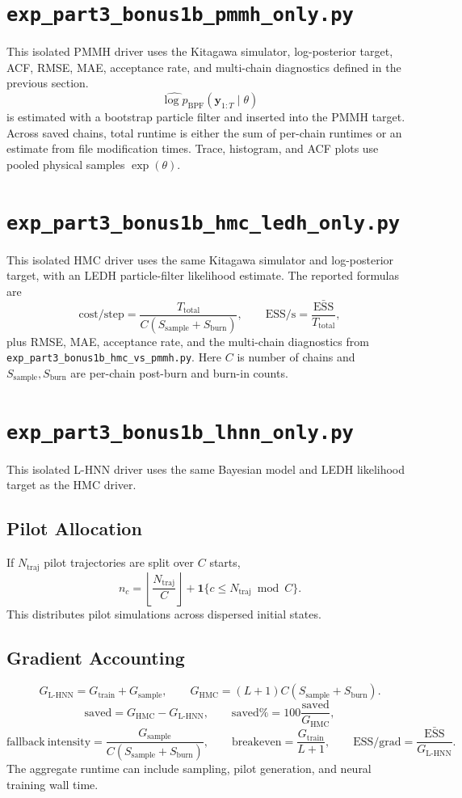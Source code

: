 \documentclass[11pt]{article}
\newcommand{\code}[1]{\texttt{#1}}
\newcommand{\ESS}{\mathrm{ESS}}
\newcommand{\ind}{\mathbf{1}}
\begin{document}
\section{\code{exp\_part3\_bonus1b\_pmmh\_only.py}}
This isolated PMMH driver uses the Kitagawa simulator, log-posterior target, ACF, RMSE, MAE, acceptance rate, and multi-chain diagnostics defined in the previous section.
\[
\widehat{\log p}_{\mathrm{BPF}}(\bm y_{1:T}\mid\theta)
\]
is estimated with a bootstrap particle filter and inserted into the PMMH target. Across saved chains, total runtime is either the sum of per-chain runtimes or an estimate from file modification times. Trace, histogram, and ACF plots use pooled physical samples \(\exp(\theta)\).

\section{\code{exp\_part3\_bonus1b\_hmc\_ledh\_only.py}}
This isolated HMC driver uses the same Kitagawa simulator and log-posterior target, with an LEDH particle-filter likelihood estimate. The reported formulas are
\[
\mathrm{cost/step}=\frac{T_{\mathrm{total}}}{C(S_{\mathrm{sample}}+S_{\mathrm{burn}})},\qquad
\mathrm{ESS/s}=\frac{\bar{\ESS}}{T_{\mathrm{total}}},
\]
plus RMSE, MAE, acceptance rate, and the multi-chain diagnostics from \code{exp\_part3\_bonus1b\_hmc\_vs\_pmmh.py}. Here \(C\) is number of chains and \(S_{\mathrm{sample}},S_{\mathrm{burn}}\) are per-chain post-burn and burn-in counts.

\section{\code{exp\_part3\_bonus1b\_lhnn\_only.py}}
This isolated L-HNN driver uses the same Bayesian model and LEDH likelihood target as the HMC driver.

\subsection*{Pilot Allocation}
If \(N_{\mathrm{traj}}\) pilot trajectories are split over \(C\) starts,
\[
n_c=\left\lfloor\frac{N_{\mathrm{traj}}}{C}\right\rfloor+\ind\{c\le N_{\mathrm{traj}}\bmod C\}.
\]
This distributes pilot simulations across dispersed initial states.

\subsection*{Gradient Accounting}
\[
G_{\mathrm{L\text{-}HNN}}=G_{\mathrm{train}}+G_{\mathrm{sample}},\qquad
G_{\mathrm{HMC}}=(L+1)C(S_{\mathrm{sample}}+S_{\mathrm{burn}}).
\]
\[
\mathrm{saved}=G_{\mathrm{HMC}}-G_{\mathrm{L\text{-}HNN}},\qquad
\mathrm{saved\%}=100\frac{\mathrm{saved}}{G_{\mathrm{HMC}}},
\]
\[
\mathrm{fallback\ intensity}=\frac{G_{\mathrm{sample}}}{C(S_{\mathrm{sample}}+S_{\mathrm{burn}})},\qquad
\mathrm{breakeven}=\frac{G_{\mathrm{train}}}{L+1},\qquad
\mathrm{ESS/grad}=\frac{\bar{\ESS}}{G_{\mathrm{L\text{-}HNN}}}.
\]
The aggregate runtime can include sampling, pilot generation, and neural training wall time.
\end{document}
